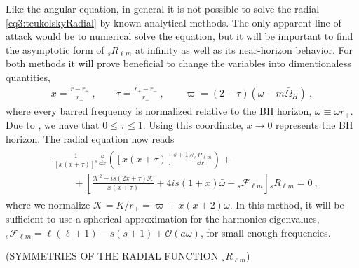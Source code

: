 Like the angular equation, in general it is not possible to solve the radial \eqref{eq3:teukolskyRadial} by known analytical methods.
The only apparent line of attack would be to numerical solve the equation, but it will be important to find the asymptotic form of ${}_{s}R_{\ell m}$ at infinity as well as its near-horizon behavior. 
For both methods it will prove beneficial to change the variables into dimentionaless quantities,
\begin{align}
    x = \frac{r - r_{+}}{r_{+}} ~,\qquad \tau = \frac{r_{+} - r_{-}}{r_{+}} ~,\qquad \varpi = (2-\tau)( \bar\omega - m \bar{\Omega}_H) ~,
\end{align}
where every barred frequency is normalized relative to the BH horizon, $\bar\omega\equiv\omega r_{+}$. Due to , we have that $0\le\tau\le 1$. Using this coordinate, $x\to0$ represents the BH horizon. The radial equation now reads
\begin{align}
    \label{eq3:radialTeukolskyAdimensional}
    \begin{split}
        & \frac{1}{[x(x+\tau)]^s} \frac{\dd}{\dd x}\left( [x(x+\tau)]^{s+1} \frac{\dd \,{}_{s}R_{\ell m}}{\dd x} \right) + \\
        &\qquad + \left[ \frac{\mathscr{K}^2 - i s (2 x+\tau) \mathscr{K}}{x(x+\tau)} + 4 i s (1 + x)\bar{\omega} - {}_{s}\mathscr{F}_{\ell m} \right] {}_{s}R_{\ell m} = 0 ~,
    \end{split}
\end{align}
where we normalize $\mathscr{K} = K/r_{+} = \varpi + x(x+2)\bar{\omega}$. In this method, it will be sufficient to use a spherical approximation for the harmonics eigenvalues, ${}_{s}\mathscr{F}_{\ell m} = \ell(\ell+1) - s(s+1) + \mathscr{O}(a\omega)$, for small enough frequencies.

(SYMMETRIES OF THE RADIAL FUNCTION ${}_{s}R_{\ell m}$)

